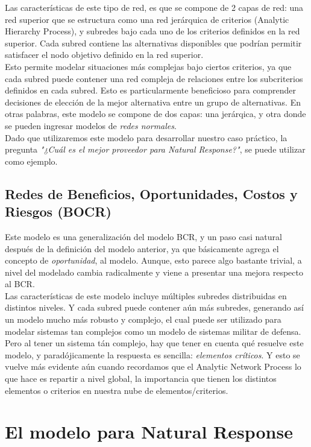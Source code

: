 \documentclass[12pt,letterpaper]{article}
\begin{document}
Las características de este tipo de red, es que se compone de 2 capas de red: una red superior que se estructura como una red jerárquica de criterios (Analytic Hierarchy Process), y subredes bajo cada uno de los criterios definidos en la red superior. Cada subred contiene las alternativas disponibles que podrían permitir satisfacer el nodo objetivo definido en la red superior.\\
\indent Esto permite modelar situaciones más complejas bajo ciertos criterios, ya que cada subred puede contener una red compleja de relaciones entre los subcriterios definidos en cada subred. Esto es particularmente beneficioso para comprender decisiones de elección de la mejor alternativa entre un grupo de alternativas. En otras palabras, este modelo se compone de dos capas: una jerárqica, y otra donde se pueden ingresar modelos de \textit{redes normales}.\\
Dado que utilizaremos este modelo para desarrollar nuestro caso práctico, la pregunta \textit{"¿Cuál es el mejor proveedor para Natural Response?"}, se puede utilizar como ejemplo.
\subsection{Redes de  Beneficios, Oportunidades, Costos y Riesgos (BOCR)}
Este modelo es una generalización del modelo BCR, y un paso casi natural después de la definición del modelo anterior, ya que básicamente agrega el concepto de \textit{oportunidad}, al modelo. Aunque, esto parece algo bastante trivial, a nivel del modelado cambia radicalmente y viene a presentar una mejora respecto al BCR.\\

Las características de este modelo incluye múltiples subredes distribuidas en distintos niveles. Y cada subred puede contener aún más subredes, generando así un modelo mucho más robusto y complejo, el cual puede ser utilizado para modelar sistemas tan complejos como un modelo de sistemas militar de defensa.\\
\indent Pero al tener un sistema tán complejo, hay que tener en cuenta qué resuelve este modelo, y paradójicamente la respuesta es sencilla: \textit{elementos críticos}. Y esto se vuelve más evidente aún cuando recordamos que el Analytic Network Process lo que hace es repartir a nivel global, la importancia que tienen los distintos elementos o criterios en nuestra nube de elementos/criterios.

\newpage
\section{El modelo para Natural Response}
\end{document}
